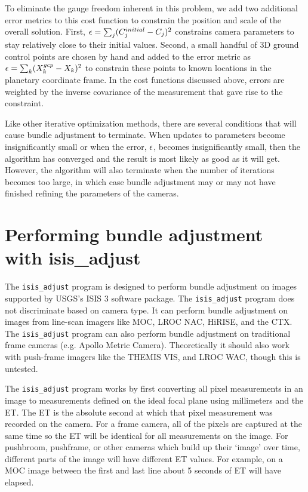 To eliminate the gauge freedom inherent in this problem, we add two
additional error metrics to this cost function to constrain the position
and scale of the overall solution. First, ${\bf \epsilon} =
\sum_j(C_j^{initial}-C_j)^2$ constrains camera parameters to stay
relatively close to their initial values.  Second, a small handful of
3D ground control points are chosen by hand and added to the
error metric as ${\bf \epsilon} = \sum_k(X_k^{gcp}-X_k)^2$ to
constrain these points to known locations in the planetary coordinate
frame.  In the cost functions discussed above, errors are weighted by
the inverse covariance of the measurement that gave rise to the
constraint.

Like other iterative optimization methods, there are several
conditions that will cause bundle adjustment to terminate.  When
updates to parameters become insignificantly small or when the error,
${\bf \epsilon}$, becomes insignificantly small, then the algorithm
has converged and the result is most likely as good as it will get.
However, the algorithm will also terminate when the number of
iterations becomes too large, in which case bundle adjustment may or
may not have finished refining the parameters of the cameras.

\section{Performing bundle adjustment with isis\_adjust}

The \texttt{isis\_adjust} program is designed to perform bundle
adjustment on images supported by USGS's \ac{ISIS} 3 software
package.  The \texttt{isis\_adjust} program does not discriminate
based on camera type.  It can perform bundle adjustment on images
from line-scan imagers like \ac{MOC}, \ac{LROC} NAC, \ac{HiRISE},
and the \ac{CTX}.  The \texttt{isis\_adjust} program can also perform
bundle adjustment on traditional frame cameras (e.g. Apollo Metric
Camera).  Theoretically it should also work with push-frame
imagers like the \ac{THEMIS} VIS, and \ac{LROC} WAC, though this is
untested.

The \texttt{isis\_adjust} program works by first converting all
pixel measurements in an image to measurements defined on the ideal
focal plane using millimeters and the \ac{ET}. The \ac{ET} is the
absolute second at which that pixel measurement was recorded on the
camera.  For a frame camera, all of the pixels are captured at the
same time so the \ac{ET} will be identical for all measurements on
the image.  For pushbroom, pushframe, or other cameras which build
up their `image' over time, different parts of the image will have
different ET values.  For example, on a MOC image between the first
and last line about 5 seconds of \ac{ET} will have elapsed.

